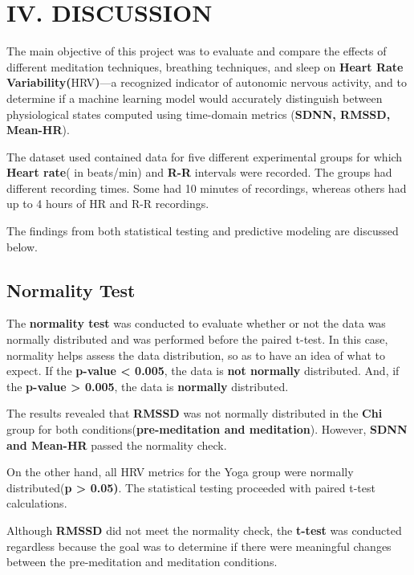 \documentclass[
  11pt,
]{ieee}
\begin{document}
\section{IV. DISCUSSION}\label{iv.-discussion}

The main objective of this project was to evaluate and compare the
effects of different meditation techniques, breathing techniques, and
sleep on \textbf{Heart Rate Variability(}HRV\textbf{)}---a recognized
indicator of autonomic nervous activity, and to determine if a machine
learning model would accurately distinguish between physiological states
computed using time-domain metrics (\textbf{SDNN, RMSSD, Mean-HR}).

The dataset used contained data for five different experimental groups
for which \textbf{Heart rate}( in beats/min) and \textbf{R-R} intervals
were recorded. The groups had different recording times. Some had 10
minutes of recordings, whereas others had up to 4 hours of HR and R-R
recordings.

The findings from both statistical testing and predictive modeling are
discussed below.

\subsection{Normality Test}\label{normality-test}

\vspace{0.8em}

The \textbf{normality test} was conducted to evaluate whether or not the
data was normally distributed and was performed before the paired
t-test. In this case, normality helps assess the data distribution, so
as to have an idea of what to expect. If the \textbf{p-value \textless{}
0.005}, the data is \textbf{not normally} distributed. And, if the
\textbf{p-value \textgreater{} 0.005}, the data is \textbf{normally}
distributed.

The results revealed that \textbf{RMSSD} was not normally distributed in
the \textbf{Chi} group for both conditions(\textbf{pre-meditation and
meditation}). However, \textbf{SDNN and Mean-HR} passed the normality
check.

On the other hand, all HRV metrics for the Yoga group were normally
distributed(\textbf{p \textgreater{} 0.05)}. The statistical testing
proceeded with paired t-test calculations.

Although \textbf{RMSSD} did not meet the normality check, the
\textbf{t-test} was conducted regardless because the goal was to
determine if there were meaningful changes between the pre-meditation
and meditation conditions.
\end{document}
